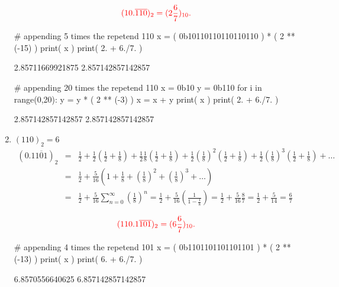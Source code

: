 \documentclass[pdftex,11pt]{article}
\begin{document}
\begin{enumerate}
$$\color{red}(10.\overline{110})_2 = (2\frac{6}{7})_{10} .$$



\begin{python}
# appending 5 times the repetend 110
x = ( 0b10110110110110110 ) * ( 2 ** (-15) )
print( x )
print( 2. + 6./7. )
\end{python}
\begin{pythonoutput}
2.85711669921875
2.857142857142857
\end{pythonoutput}

\begin{python}
# appending 20 times the repetend 110
x = 0b10
y = 0b110
for i in range(0,20):
  y = y * ( 2 ** (-3) )
  x = x + y
print( x )
print( 2. + 6./7. )
\end{python}
\begin{pythonoutput}
2.857142857142857
2.857142857142857
\end{pythonoutput}




\item 
$(110)_2 = 6 $
\begin{eqnarray}
(0.1\overline{101})_{2} 
\nonumber & = & 
\frac{1}{2}+
\frac{1}{2}\left(\frac{1}{2}+ \frac{1}{8}\right)
+ \frac{1}{2}\frac{1}{8}\left(\frac{1}{2}+ \frac{1}{8}\right)
+ \frac{1}{2}\left(\frac{1}{8}\right)^2\left(\frac{1}{2}+ \frac{1}{8}\right)
+ \frac{1}{2}\left(\frac{1}{8}\right)^3\left(\frac{1}{2}+ \frac{1}{8}\right)
+ \ldots\\
\nonumber & = & 
\frac{1}{2}+ \frac{5}{16}\left(1 + \frac{1}{8}+ \left(\frac{1}{8}\right)^2+ \left(\frac{1}{8}\right)^3+\ldots \right)\\
\nonumber & = &
\frac{1}{2}+  \frac{5}{16}\sum_{n=0}^\infty\left(\frac{1}{8}\right)^n
 = \frac{1}{2}+  \frac{5}{16}\left(\frac{1}{1-\frac{1}{8}}\right)
 = \frac{1}{2}+  \frac{5}{16}\frac{8}{7}
 = \frac{1}{2}+  \frac{5}{14}
 = \frac{6}{7}
\end{eqnarray}

$$\color{red}(110.1\overline{101})_2 = (6\frac{6}{7})_{10} .$$



\begin{python}
# appending 4 times the repetend 101
x = ( 0b1101101101101101 ) * ( 2 ** (-13) )
print( x )
print( 6. + 6./7. )
\end{python}
\begin{pythonoutput}
6.8570556640625
6.857142857142857
\end{pythonoutput}


\end{enumerate}
\end{document}
